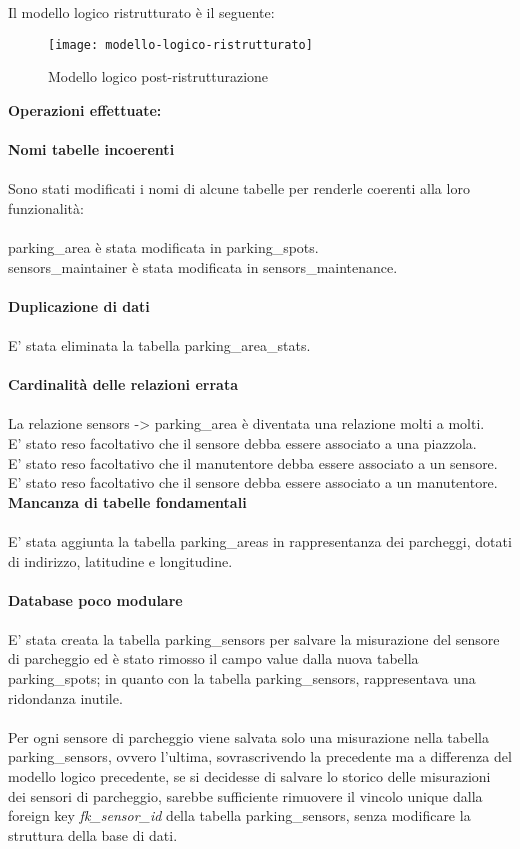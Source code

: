 Il modello logico ristrutturato è il seguente:
\begin{figure}[H]
  \centering
  \texttt{[image: modello-logico-ristrutturato]}
  \caption{Modello logico post-ristrutturazione}
\end{figure}
\leavevmode\newline
\textbf{Operazioni effettuate:}
\\\\
\textbf{Nomi tabelle incoerenti}
\\\\
Sono stati modificati i nomi di alcune tabelle per renderle coerenti alla loro funzionalità:
\\\\
parking\_area è stata modificata in parking\_spots.
\\
sensors\_maintainer è stata modificata in sensors\_maintenance.
\\\\
\textbf{Duplicazione di dati}
\\\\
E' stata eliminata la tabella parking\_area\_stats.
\\\\
\textbf{Cardinalità delle relazioni errata}
\\\\
La relazione sensors -> parking\_area è diventata una relazione molti a molti.
\\
E' stato reso facoltativo che il sensore debba essere associato a una piazzola.
\\
E' stato reso facoltativo che il manutentore debba essere associato a un sensore.
\\
E' stato reso facoltativo che il sensore debba essere associato a un manutentore.
\clearpage
\leavevmode\newline
\textbf{Mancanza di tabelle fondamentali}
\\\\
E' stata aggiunta la tabella parking\_areas in rappresentanza dei parcheggi, dotati di indirizzo, latitudine e 
longitudine.
\\\\
\textbf{Database poco modulare}
\\\\
E' stata creata la tabella parking\_sensors per salvare la misurazione del sensore di parcheggio ed è
stato rimosso il campo value dalla nuova tabella parking\_spots; in quanto con la tabella parking\_sensors,
rappresentava una ridondanza inutile.
\\\\
Per ogni sensore di parcheggio viene salvata solo una misurazione nella tabella parking\_sensors, ovvero
l'ultima, sovrascrivendo la precedente ma a differenza del modello logico precedente, se 
si decidesse di salvare lo storico delle misurazioni dei sensori di parcheggio, sarebbe sufficiente rimuovere
il vincolo unique dalla foreign key \textit{fk\_sensor\_id} della tabella parking\_sensors, senza modificare la struttura della base di dati.